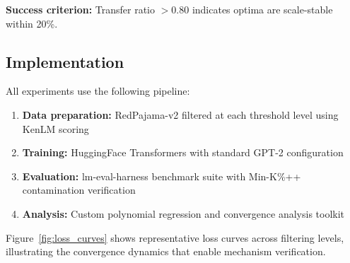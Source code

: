 \textbf{Success criterion:} Transfer ratio $> 0.80$ indicates optima are scale-stable within 20\%.

\subsection{Implementation}

All experiments use the following pipeline:
\begin{enumerate}
    \item \textbf{Data preparation:} RedPajama-v2 filtered at each threshold level using KenLM scoring
    \item \textbf{Training:} HuggingFace Transformers with standard GPT-2 configuration
    \item \textbf{Evaluation:} lm-eval-harness benchmark suite with Min-K\%++ contamination verification
    \item \textbf{Analysis:} Custom polynomial regression and convergence analysis toolkit
\end{enumerate}

Figure~\ref{fig:loss_curves} shows representative loss curves across filtering levels, illustrating the convergence dynamics that enable mechanism verification.
